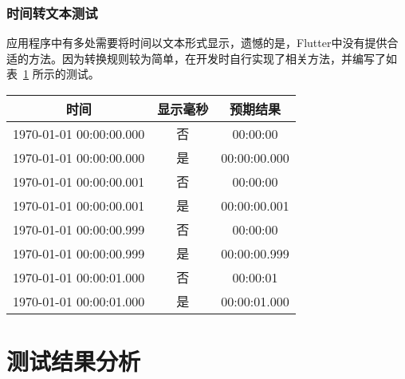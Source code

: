\subsubsection{时间转文本测试}

应用程序中有多处需要将时间以文本形式显示，遗憾的是，Flutter中没有提供合适的方法。因为转换规则较为简单，在开发时自行实现了相关方法，并编写了如表~\ref{tab:time-to-text} 所示的测试。

\begin{table}[!ht]
    \centering
    \label{tab:time-to-text}
    \begin{tabular}{|c|c|c|}
        \hline
        时间                      & 显示毫秒 & 预期结果         \\
        \hline
        1970-01-01 00:00:00.000 & 否    & 00:00:00     \\
        \hline
        1970-01-01 00:00:00.000 & 是    & 00:00:00.000 \\
        \hline
        1970-01-01 00:00:00.001 & 否    & 00:00:00     \\
        \hline
        1970-01-01 00:00:00.001 & 是    & 00:00:00.001 \\
        \hline
        1970-01-01 00:00:00.999 & 否    & 00:00:00     \\
        \hline
        1970-01-01 00:00:00.999 & 是    & 00:00:00.999 \\
        \hline
        1970-01-01 00:00:01.000 & 否    & 00:00:01     \\
        \hline
        1970-01-01 00:00:01.000 & 是    & 00:00:01.000 \\
        \hline
    \end{tabular}
\end{table}


\section{测试结果分析}\label{sec:test-result}

